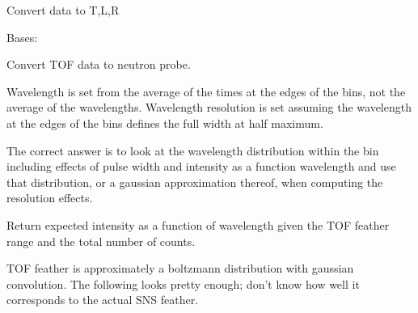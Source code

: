 \documentclass[letterpaper,10pt,english]{sphinxmanual}
\begin{document}

\begin{fulllineitems}
\label{api/snsdata:refl1d.snsdata.QRL_to_data}
Convert data to T,L,R

\end{fulllineitems}


\begin{fulllineitems}
\label{api/snsdata:refl1d.snsdata.SNSData}
Bases: 

\begin{fulllineitems}
\label{api/snsdata:refl1d.snsdata.SNSData.load}
\end{fulllineitems}


\end{fulllineitems}


\begin{fulllineitems}
\label{api/snsdata:refl1d.snsdata.TOF_to_data}
Convert TOF data to neutron probe.

Wavelength is set from the average of the times at the edges of the
bins, not the average of the wavelengths.  Wavelength resolution is
set assuming the wavelength at the edges of the bins defines the
full width at half maximum.

The correct answer is to look at the wavelength distribution within
the bin including effects of pulse width and intensity as a function
wavelength and use that distribution, or a gaussian approximation
thereof, when computing the resolution effects.

\end{fulllineitems}


\begin{fulllineitems}
\label{api/snsdata:refl1d.snsdata.boltzmann_feather}
Return expected intensity as a function of wavelength given the TOF
feather range and the total number of counts.

TOF feather is approximately a boltzmann distribution with gaussian
convolution.  The following looks pretty enough; don't know how well it
corresponds to the actual SNS feather.

\end{fulllineitems}
\end{document}
